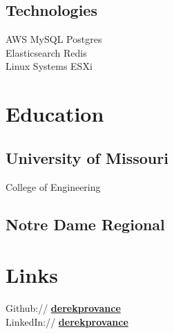 \documentclass[]{resume}
\begin{document}
\begin{minipage}[t]{0.33\textwidth}
\subsection{Technologies}
AWS \textbullet{} MySQL \textbullet{}  Postgres \\
Elasticsearch \textbullet{}  Redis \\
Linux Systems \textbullet{}  ESXi
\sectionsep


\section{Education}

\subsection{University of Missouri}
College of Engineering \\
\sectionsep

\subsection{Notre Dame Regional}
\sectionsep


\section{Links}
Github:// \href{https://github.com/derekprovance}{\bf derekprovance} \\
LinkedIn://  \href{https://www.linkedin.com/in/derekprovance}{\bf derekprovance} \\

%
%

\end{minipage}
\hfill
\end{document}
